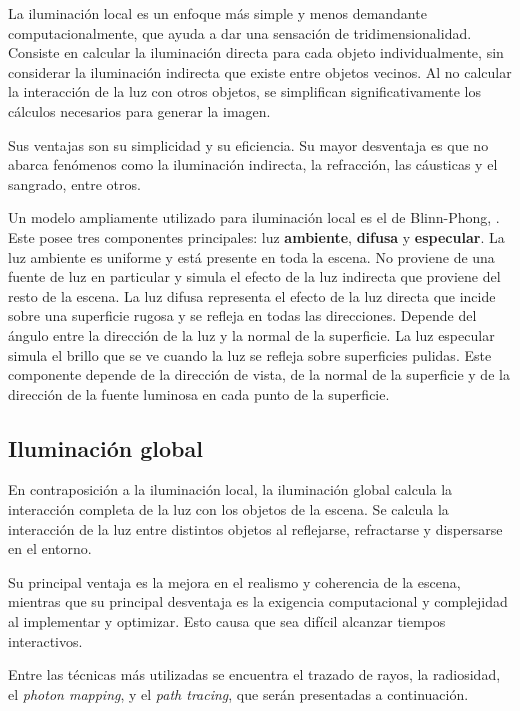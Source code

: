 La iluminación local es un enfoque más simple y menos demandante computacionalmente, que ayuda a dar una sensación de tridimensionalidad.
Consiste en calcular la iluminación directa para cada objeto individualmente, sin considerar la iluminación indirecta que existe entre objetos vecinos.
Al no calcular la interacción de la luz con otros objetos, se simplifican significativamente los cálculos necesarios para generar la imagen.

Sus ventajas son su simplicidad y su eficiencia.
Su mayor desventaja es que no abarca fenómenos como la iluminación indirecta, la refracción, las cáusticas y el sangrado, entre otros.

Un modelo ampliamente utilizado para iluminación local es el de Blinn-Phong, \cite{blinn-phong}.
Este posee tres componentes principales: luz \textbf{ambiente}, \textbf{difusa} y \textbf{especular}.
La luz ambiente es uniforme y está presente en toda la escena.
No proviene de una fuente de luz en particular y simula el efecto de la luz indirecta que proviene del resto de la escena.
La luz difusa representa el efecto de la luz directa que incide sobre una superficie rugosa y se refleja en todas las direcciones.
Depende del ángulo entre la dirección de la luz y la normal de la superficie.
La luz especular simula el brillo que se ve cuando la luz se refleja sobre superficies pulidas.
Este componente depende de la dirección de vista, de la normal de la superficie y de la dirección de la fuente luminosa en cada punto de la superficie.


\subsection{Iluminación global}

En contraposición a la iluminación local, la iluminación global calcula la interacción completa de la luz con los objetos de la escena.
Se calcula la interacción de la luz entre distintos objetos al reflejarse, refractarse y dispersarse en el entorno.

Su principal ventaja es la mejora en el realismo y coherencia de la escena, mientras que su principal desventaja es la exigencia computacional y complejidad al implementar y optimizar.
Esto causa que sea difícil alcanzar tiempos interactivos.

Entre las técnicas más utilizadas se encuentra el trazado de rayos, la radiosidad, el \textit{photon mapping}, y el \textit{path tracing}, que serán presentadas a continuación.

